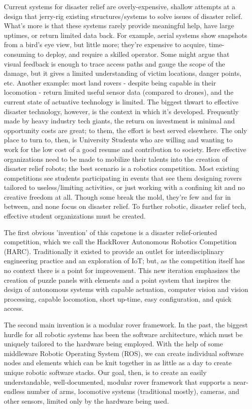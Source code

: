 \documentclass[a4paper, 10pt]{article}
\begin{document}
		Current systems for disaster relief are overly-expensive, shallow attempts at a design that jerry-rig existing structures/systems to solve issues of disaster relief. What’s more is that these systems rarely provide meaningful help, have large uptimes, or return limited data back. For example, aerial systems show snapshots from a bird's eye view, but little more; they're expensive to acquire, time-consuming to deploy, and require a skilled operator. Some might argue that visual feedback is enough to trace access paths and gauge the scope of the damage, but it gives a limited understanding of victim locations, danger points, etc. Another example: most land rovers - despite being capable in their locomotion - return limited useful sensor data (compared to drones), and the current state of actuative technology is limited. The biggest thwart to effective disaster technology, however, is the context in which it's developed. Frequently made by heavy industry tech giants, the return on investment is minimal and opportunity costs are great; to them, the effort is best served elsewhere. The only place to turn to, then, is University Students who are willing and wanting to work for the low cost of a good resume and contribution to society. Here effective organizations need to be made to mobilize their talents into the creation of disaster relief robots; the best scenario is a robotics competition. Most existing competitions see students participating in events that see them designing rovers tailored to useless/limiting activities, or just working with a confining kit and no creative freedom at all. Though some break the mold, they're few and far in between, and none focus on disaster relief. To further robotic, disaster relief tech, effective student organizations must be created.
		
	The first obvious 'invention' of this capstone is a disaster relief-oriented competition, which we call the HackRover Autonomous Robotics Competition (HARC). Traditionally it existed to provide an outlet for interdisciplinary engineering practice and an exploration of IoT; but, as the competition itself has no context there is a point for improvement. This new iteration emphasizes the creation of puzzle panels with elements and a point system that inspires the design of autonomous systems with capable actuation, computer vision and vision processing, capable locomotion, short up-time, easy configuration, and quick access.

The second main invention is a modular rover framework. In the past, the biggest hurdle for all robotic systems has been the software architecture, which must be uniquely tailored to the hardware being employed. With the help of some middleware Robotic Operating System (ROS), we can create individual software nodes and elements which can be knit together in as little as a day to create unique robotic software stacks. Our goal, then, is to create an easily understandable, well-documented, modular rover framework that supports a near-endless number of arms, locomotive systems (traditional mostly), cameras, and other sensors, limited only by the hardware being used.	
\end{document}
